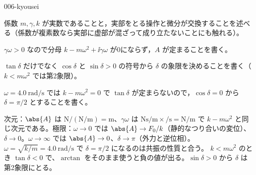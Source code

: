 \documentclass[uplatex,dvipdfmx,a4paper,11pt]{jsarticle}
\begin{document}
\begin{kaisetsu}{006-kyousei}
\begin{ronten}
  \item {} 係数 $m,\gamma,k$ が実数であることと，実部をとる操作と微分が交換することを述べる（係数が複素数なら実部に虚部が混ざって成り立たないことにも触れる）。
  \item {} $\gamma\omega>0$ なので分母 $k-m\omega^{2}+\ii\gamma\omega$ が0にならず，$A$ が定まることを書く。
  \item {} $\tan\delta$ だけでなく $\cos\delta$ と $\sin\delta>0$ の符号から $\delta$ の象限を決めることを書く（$k<m\omega^{2}$ では第2象限）。
  \item {} $\omega=\qty{4.0}{\radian\per\second}$ では $k-m\omega^{2}=0$ で $\tan\delta$ が定まらないので，$\cos\delta=0$ から $\delta=\pi/2$ とすることを書く。
\end{ronten}
\kenzan 次元：$\abs{A}$ は $\unit{\newton}/(\unit{\newton\per\metre})=\unit{\metre}$、$\gamma\omega$ は $\unit{\newton\second\per\metre}\times\unit{\per\second}=\unit{\newton\per\metre}$ で $k-m\omega^{2}$ と同じ次元である。極限：$\omega\to0$ では $\abs{A}\to F_{0}/k$（静的なつり合いの変位）、$\delta\to0$。$\omega\to\infty$ では $\abs{A}\to0$、$\delta\to\pi$（外力と逆位相）。$\omega=\sqrt{k/m}=\qty{4.0}{\radian\per\second}$ で $\delta=\pi/2$ になるのは共振の性質と合う。
\tsumazuki $k<m\omega^{2}$ のとき $\tan\delta<0$ で、$\arctan$ をそのまま使うと負の値が出る。$\sin\delta>0$ から $\delta$ は第2象限にとる。
\end{kaisetsu}
\end{document}
